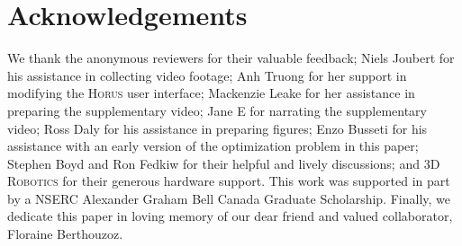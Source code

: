 
\section*{Acknowledgements}
\label{sec:acknowledgements}

We thank the anonymous reviewers for their valuable feedback;
Niels Joubert for his assistance in collecting video footage;
Anh Truong for her support in modifying the \textsc{Horus} user interface;
Mackenzie Leake for her assistance in preparing the supplementary video;
Jane E for narrating the supplementary video;
Ross Daly for his assistance in preparing figures;
Enzo Busseti for his assistance with an early version of the optimization problem in this paper;
Stephen Boyd and Ron Fedkiw for their helpful and lively discussions;
and \textsc{3D Robotics} for their generous hardware support.
This work was supported in part by a NSERC Alexander Graham Bell Canada Graduate Scholarship.
Finally, we dedicate this paper in loving memory of our dear friend and valued collaborator, Floraine Berthouzoz.
